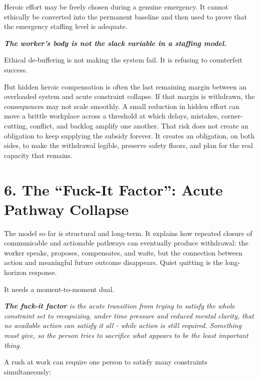 \documentclass[11pt,oneside]{article}
\renewenvironment{quote}
  {\begin{tcolorbox}[
      enhanced,
      breakable,
      colback=ManifestLight,
      colframe=ManifestRule,
      boxrule=0pt,
      leftrule=3pt,
      arc=0pt,
      outer arc=0pt,
      left=10pt,right=10pt,top=8pt,bottom=8pt,
      before skip=0.8em,after skip=0.8em
    ]\itshape}
  {\end{tcolorbox}}
\begin{document}
Heroic effort may be freely chosen during a genuine emergency. It cannot
ethically be converted into the permanent baseline and then used to
prove that the emergency staffing level is adequate.

\begin{quote}
\textbf{The worker's body is not the slack variable in a staffing
model.}
\end{quote}

Ethical de-buffering is not making the system fail. It is refusing to
counterfeit success.

But hidden heroic compensation is often the last remaining margin
between an overloaded system and acute constraint collapse. If that
margin is withdrawn, the consequences may not scale smoothly. A small
reduction in hidden effort can move a brittle workplace across a
threshold at which delays, mistakes, corner-cutting, conflict, and
backlog amplify one another. That risk does not create an obligation to
keep supplying the subsidy forever. It creates an obligation, on both
sides, to make the withdrawal legible, preserve safety floors, and plan
for the real capacity that remains.

\section{6. The ``Fuck-It Factor'': Acute Pathway
Collapse}\label{the-fuck-it-factor-acute-pathway-collapse}

The model so far is structural and long-term. It explains how repeated
closure of communicable and actionable pathways can eventually produce
withdrawal: the worker speaks, proposes, compensates, and waits, but the
connection between action and meaningful future outcome disappears.
Quiet quitting is the long-horizon response.

It needs a moment-to-moment dual.

\begin{quote}
\textbf{The fuck-it factor} is the acute transition from trying to
satisfy the whole constraint set to recognizing, under time pressure and
reduced mental clarity, that no available action can satisfy it all -
while action is still required. Something must give, so the person tries
to sacrifice what appears to be the least important thing.
\end{quote}

A rush at work can require one person to satisfy many constraints
simultaneously:
\end{document}
